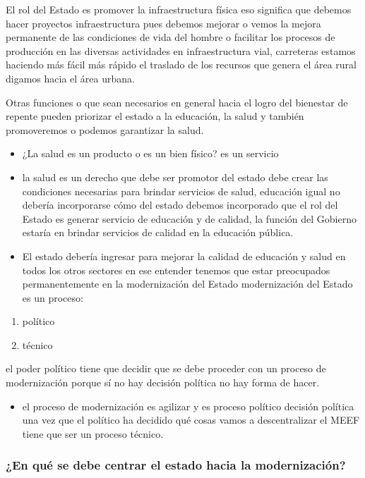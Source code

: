 \documentclass[
  letterpaper,
  DIV=11,
  numbers=noendperiod]{scrartcl}
\providecommand{\tightlist}{%
  \setlength{\itemsep}{0pt}\setlength{\parskip}{0pt}}\usepackage{longtable,booktabs,array}
\begin{document}
El rol del Estado es promover la infraestructura física eso significa
que debemos hacer proyectos infraestructura pues debemos mejorar o vemos
la mejora permanente de las condiciones de vida del hombre o facilitar
los procesos de producción en las diversas actividades en
infraestructura vial, carreteras estamos haciendo más fácil más rápido
el traslado de los recursos que genera el área rural digamos hacia el
área urbana.

Otras funciones o que sean necesarios en general hacia el logro del
bienestar de repente pueden priorizar el estado a la educación, la salud
y también promoveremos o podemos garantizar la salud.

\begin{itemize}
\tightlist
\item
  ¿La salud es un producto o es un bien físico? es un servicio
\item
  la salud es un derecho que debe ser promotor del estado debe crear las
  condiciones necesarias para brindar servicios de salud, educación
  igual no debería incorporarse cómo del estado debemos incorporado que
  el rol del Estado es generar servicio de educación y de calidad, la
  función del Gobierno estaría en brindar servicios de calidad en la
  educación pública.
\item
  El estado debería ingresar para mejorar la calidad de educación y
  salud en todos los otros sectores en ese entender tenemos que estar
  preocupados permanentemente en la modernización del Estado
  modernización del Estado es un proceso:
\end{itemize}

\begin{enumerate}
\def\labelenumi{\arabic{enumi}.}
\tightlist
\item
  político
\item
  técnico
\end{enumerate}

el poder político tiene que decidir que se debe proceder con un proceso
de modernización porque sí no hay decisión política no hay forma de
hacer.

\begin{itemize}
\tightlist
\item
  el proceso de modernización es agilizar y es proceso político decisión
  política una vez que el político ha decidido qué cosas vamos a
  descentralizar el MEEF tiene que ser un proceso técnico.
\end{itemize}

\hypertarget{en-quuxe9-se-debe-centrar-el-estado-hacia-la-modernizaciuxf3n}{%
\subsubsection{¿En qué se debe centrar el estado hacia la
modernización?}\label{en-quuxe9-se-debe-centrar-el-estado-hacia-la-modernizaciuxf3n}}
\end{document}

